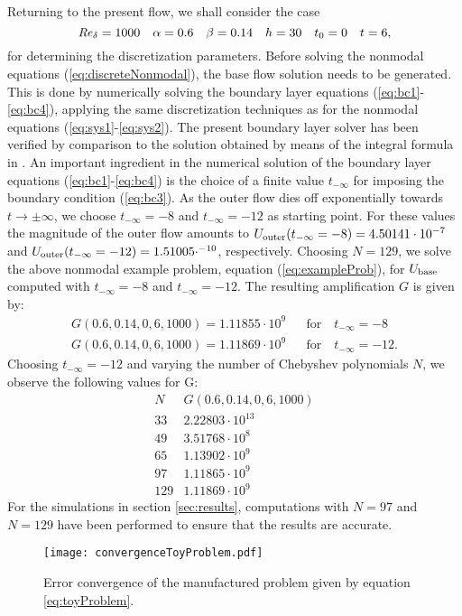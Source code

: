 \documentclass{jfm}
\newcommand\be{\begin{equation}}
\newcommand\ee{\end{equation}}
\newcommand\bea{\begin{eqnarray}}
\newcommand\eea{\end{eqnarray}}
\newcommand\base{{\rm base}}
\newcommand{\free}{{\rm outer}}
\newcommand\Rey{\mbox{\textit{Re}}}  %
\begin{document}
\begin{appendix}
Returning to the present flow, we shall consider the case
\be
\Rey_\delta = 1000 \quad \alpha = 0.6 \quad \beta = 0.14 \quad h = 30 \quad t_0 = 0
\quad t = 6,  \label{eq:exampleProb}
\ee
for determining the discretization parameters. Before solving the nonmodal equations
(\ref{eq:discreteNonmodal}), the base flow solution needs to be generated.
This is done by numerically solving the boundary layer equations
(\ref{eq:bc1}-\ref{eq:bc4}), applying the same discretization techniques as for
the nonmodal equations (\ref{eq:sys1}-\ref{eq:sys2}). The
present boundary layer solver has been verified by comparison to the solution
obtained by means of the integral formula in \cite{LiuParkCowen2007}. 
An important ingredient in the numerical solution of the boundary layer
equations (\ref{eq:bc1}-\ref{eq:bc4}) is the choice
of a finite value $ t_{-\infty} $ for imposing
the boundary condition (\ref{eq:bc3}). As the outer flow
dies off exponentially towards $ t \rightarrow \pm \infty $, we choose $ t_{-\infty} = -8 $
and $ t_{-\infty} = -12 $ as starting point. For these values the magnitude of the outer flow
amounts to $ U_\free(t_{-\infty} = -8) = 4.50141 \cdot 10^{-7} $ and
$ U_\free(t_{-\infty} = -12) = 1.51005 \cdot^{-10} $, respectively. Choosing $ N = 129 $, we
solve the above nonmodal example problem, equation (\ref{eq:exampleProb}), for $ U_\base $ computed
with $ t_{-\infty} = -8 $ and $ t_{-\infty} = -12 $. The resulting amplification $ G $ is
given by:
\bea
G(0.6,0.14,0,6,1000) = 1.11855 \cdot 10^{9} & & \mbox{for} \quad t_{-\infty} = -8 \\
G(0.6,0.14,0,6,1000) = 1.11869 \cdot 10^{9} & & \mbox{for} \quad t_{-\infty} = -12.
\eea
Choosing $ t_{-\infty} = -12 $ and varying the number of Chebyshev polynomials $ N $,
we observe the following values for G:
\[
\begin{array}{r|l}
  N & G(0.6,0.14,0,6,1000)\\
  \hline 
  33 & 2.22803 \cdot 10^{13} \\
  49 & 3.51768 \cdot 10^8 \\
  65 & 1.13902 \cdot 10^{9} \\
  97 & 1.11865 \cdot 10^{9} \\
  129 & 1.11869 \cdot 10^{9}
  \end{array}
\]
For the simulations in section \ref{sec:results}, computations with $ N = 97 $ and $ N =129 $
have been performed to ensure that the results are accurate.

\begin{figure}
  \centering
  \texttt{[image: convergenceToyProblem.pdf]}
  \caption{Error convergence of the manufactured problem given by
    equation \ref{eq:toyProblem}. }
  \label{fig:toyError}
\end{figure}



\end{appendix}
\end{document}
